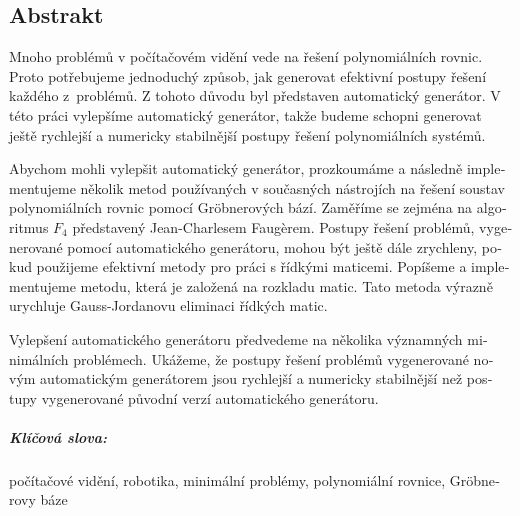 \begin{otherlanguage}{czech}
\chapter*{Abstrakt}
Mnoho problémů v počítačovém vidění vede na řešení polynomiálních rovnic. Proto potřebujeme jednoduchý způsob, jak generovat efektivní postupy řešení každého z~prob\-lémů. Z tohoto důvodu byl představen automatický generátor. V této práci vylepšíme automatický generátor, takže budeme schopni generovat ještě rychlejší a numericky stabilnější postupy řešení polynomiálních systémů.

Abychom mohli vylepšit automatický generátor, prozkoumáme a následně implementujeme několik metod používaných v současných nástrojích na řešení soustav polynomiálních rovnic pomocí Gr\"obnerových bází. Zaměříme se zejména na algoritmus $F_4$ představený Jean-Charlesem Faug\`erem. Postupy řešení problémů, vygenerované pomocí automatického generátoru, mohou být ještě dále zrychleny, pokud použijeme efektivní metody pro práci s řídkými maticemi. Popíšeme a implementujeme metodu, která je založená na rozkladu matic. Tato metoda výrazně urychluje Gauss-Jordanovu eliminaci řídkých matic.

Vylepšení automatického generátoru předvedeme na několika významných mini\-mál\-ních problémech. Ukážeme, že postupy řešení problémů vygenerované novým automatickým generátorem jsou rychlejší a numericky stabilnější než postupy vygenerované původní verzí automatického generátoru.

\paragraph{Klíčová slova:} počítačové vidění, robotika, minimální problémy, polynomiální rovnice, Gr\"obnerovy báze
\end{otherlanguage}
